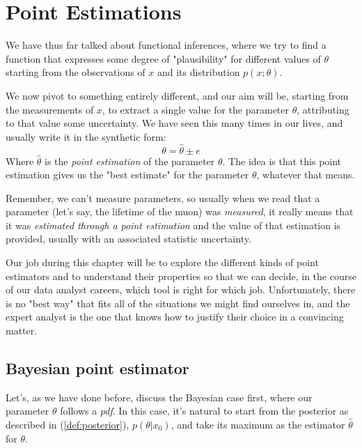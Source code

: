 \chapter{Point Estimations}
We have thus far talked about functional inferences, where we try to find a function that expresses some degree of "plausibility" for different values of $\theta$ starting from the observations of $x$ and its distribution $p(x;\theta)$. 

We now pivot to something entirely different, and our aim will be, starting from the measurements of $x$, to extract a single value for the parameter $\theta$, attributing to that value some uncertainty. We have seen this many times in our lives, and usually write it in the synthetic form:
	\[
	\theta = \hat{\theta} \pm e
	\]
Where $\hat{\theta}$ is the \emph{point estimation} of the parameter $\theta$. The idea is that this point estimation gives us the "best estimate" for the parameter $\theta$, whatever that means. 

Remember, we can't measure parameters, so usually when we read that a parameter (let's say, the lifetime of the muon) was \emph{measured}, it really means that it was \emph{estimated through a point estimation} and the value of that estimation is provided, usually with an associated statistic uncertainty. 

Our job during this chapter will be to explore the different kinds of point estimators and to understand their properties so that we can decide, in the course of our data analyst careers, which tool is right for which job. Unfortunately, there is no "best way" that fits all of the situations we might find ourselves in, and the expert analyst is the one that knows how to justify their choice in a convincing matter.

\section{Bayesian point estimator}
Let's, as we have done before, discuss the Bayesian case first, where our parameter $\theta$ follows a \emph{pdf}. In this case, it's natural to start from the posterior as described in (\ref{def:posterior}), $p(\theta|x_0)$, and take its maximum as the estimator $\hat{\theta}$ for $\theta$. 

